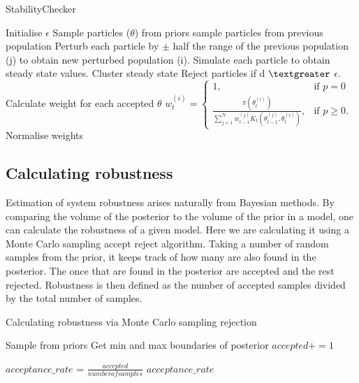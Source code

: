 \begin{algorithm}
	\label{alg:StabilityChecker}
  \caption{StabilityChecker}
 \begin{algorithmic}[1]
    \Statex
	\State Initialise $\epsilon$ 
		\State Sample particles ($\theta$) from priors
		\Else
			\State sample particles from previous population
			\State  Perturb each particle by $\pm$ half the range of the previous population (j) to obtain new perturbed population (i).
	\EndIf
    \State Simulate each particle to obtain steady state values.
    \State Cluster steady state
	\State Reject particles if d $\textgreater$ $\epsilon$.
    \State Calculate weight for each accepted $\theta$
	\State $w_{t}^{(i)} = \begin{cases} 1, & \mbox{if } p = 0 \\\frac{\pi(\theta_{t}^{(i)})}{\sum_{j=1}^N w_{t-1}^{(j)} K_{t}(\theta_{t-1}^{(j)}, \theta_{t}^{(i)})}, & \mbox{if } p \geq  0. \end{cases}$
	\State Normalise weights
	 
  \end{algorithmic}
\end{algorithm}

\subsection{Calculating robustness}

Estimation of system robustness arises naturally from Bayesian methods. By comparing the volume of the posterior to the volume of the prior in a model, one can calculate the robustness of a given model. 
Here we are calculating it using a Monte Carlo sampling accept reject algorithm. Taking a number of random samples from the prior, it keeps track of how many are also found in the posterior. The once that are found in the posterior are accepted and the rest rejected. Robustness is then defined as the number of accepted samples divided by the total number of samples.
\begin{algorithm}
	\label{alg:robustness}
  \caption{Calculating robustness via Monte Carlo sampling rejection }
 \begin{algorithmic}[1]
    \Statex
    \State Sample from priors 
    \State Get min and max boundaries of posterior
    	\State $accepted += 1$
    \EndIf
    	    	
    \State $acceptance\_rate$ = $\frac{accep
    	ted}{number of samples}$
    \State \Return $acceptance\_rate$
    
  \end{algorithmic}

\end{algorithm}








